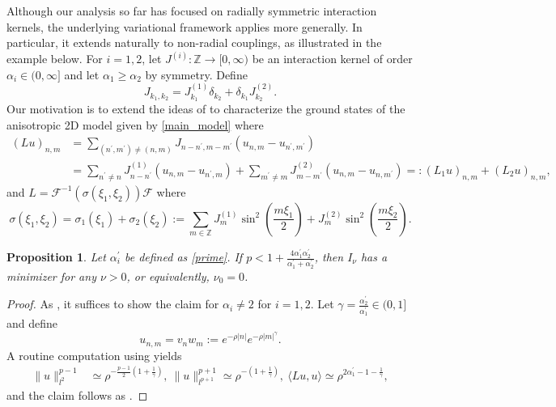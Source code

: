 \documentclass{article}
\numberwithin{equation}{section}
\newtheorem{proposition}{Proposition}[section]
\begin{document}
Although our analysis so far has focused on radially symmetric interaction kernels, the underlying variational framework applies more generally. In particular, it extends naturally to non-radial couplings, as illustrated in the example below. For $i=1,2$, let $J^{(i)}:\mathbb{Z} \rightarrow [0,\infty)$ be an interaction kernel of order $\alpha_i \in (0,\infty]$ and let $\alpha_1 \geq \alpha_2$ by symmetry. Define
\begin{equation*}
    J_{k_1,k_2} = J^{(1)}_{k_1} \delta_{k_2} + \delta_{k_1} J^{(2)}_{k_2}. 
\end{equation*}
Our motivation is to extend the ideas of  to characterize the ground states of the anisotropic 2D model given by \eqref{main_model} where
\begin{equation*}
\begin{split}
(L u)_{n,m} &= \sum_{(n^\prime,m^\prime) \neq (n,m)} J_{n-n^\prime,m-m^\prime}(u_{n,m}-u_{n^\prime,m^\prime})\\
&= \sum_{n^\prime \neq n} J^{(1)}_{n-n^\prime}(u_{n,m}-u_{n^\prime,m}) + \sum_{m^\prime \neq m} J^{(2)}_{m-m^\prime}(u_{n,m}-u_{n,m^\prime}) =: (L_1 u)_{n,m} + (L_2 u)_{n,m},     
\end{split}
\end{equation*}
and $L = \mathcal{F}^{-1} (\sigma(\xi_1,\xi_2)) \mathcal{F}$ where
\begin{equation}\label{symbol_2d}
    \sigma(\xi_1,\xi_2) = \sigma_1(\xi_1) + \sigma_2(\xi_2) := \sum\limits_{m \in \mathbb{Z}} J^{(1)}_{m} \sin^2 \left(\frac{m \xi_1}{2}\right) +  J^{(2)}_{m} \sin^2 \left(\frac{m\xi_2}{2}\right).
\end{equation}
\begin{proposition}
Let $\alpha_i^\prime$ be defined as \eqref{prime}. If $p < 1 + \frac{4\alpha_1^\prime\alpha_2^\prime}{\alpha_1^\prime + \alpha_2^\prime}$, then $I_\nu$ has a minimizer for any $\nu > 0$, or equivalently, $\nu_0 = 0$. 
\end{proposition}
\begin{proof}
As , it suffices to show the claim for $\alpha_i \neq 2$ for $i=1,2$. Let $\gamma = \frac{\alpha_2^\prime}{\alpha_1^\prime} \in (0,1]$ and define
\begin{equation*}
    u_{n,m} = v_n w_m := e^{-\rho |n|} e^{-\rho |m|^{\gamma}}.
\end{equation*}
A routine computation using  yields
\begin{equation*}
\begin{split}
\| u \|_{l^2}^{p-1} &\simeq \rho^{-\frac{p-1}{2}(1+\frac{1}{\gamma})},\ \| u \|_{l^{p+1}}^{p+1} \simeq \rho^{-(1+\frac{1}{\gamma})},\ \langle Lu,u \rangle \simeq \rho^{2\alpha_1^\prime - 1 - \frac{1}{\gamma}},    
\end{split}
\end{equation*}
and the claim follows as .
\end{proof}
\end{document}
